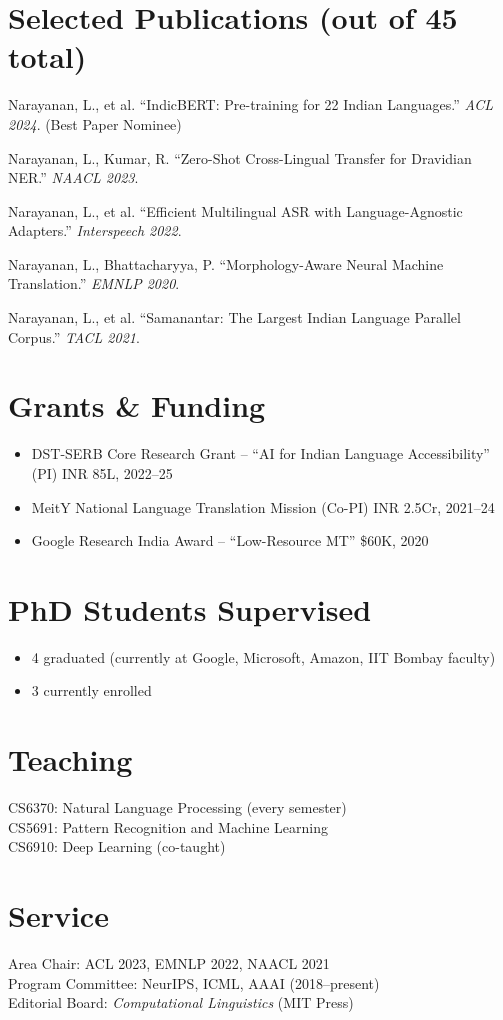 \documentclass[11pt,letterpaper]{article}
\begin{document}
\section{Selected Publications (out of 45 total)}
\begin{etaremune}[itemsep=3pt]
\item Narayanan, L., et al. ``IndicBERT: Pre-training for 22 Indian Languages.'' \textit{ACL 2024}. (Best Paper Nominee)
\item Narayanan, L., Kumar, R. ``Zero-Shot Cross-Lingual Transfer for Dravidian NER.'' \textit{NAACL 2023}.
\item Narayanan, L., et al. ``Efficient Multilingual ASR with Language-Agnostic Adapters.'' \textit{Interspeech 2022}.
\item Narayanan, L., Bhattacharyya, P. ``Morphology-Aware Neural Machine Translation.'' \textit{EMNLP 2020}.
\item Narayanan, L., et al. ``Samanantar: The Largest Indian Language Parallel Corpus.'' \textit{TACL 2021}.
\end{etaremune}

\section{Grants \& Funding}
\begin{itemize}
\item DST-SERB Core Research Grant -- ``AI for Indian Language Accessibility'' (PI) \hfill INR 85L, 2022--25
\item MeitY National Language Translation Mission (Co-PI) \hfill INR 2.5Cr, 2021--24
\item Google Research India Award -- ``Low-Resource MT'' \hfill \$60K, 2020
\end{itemize}

\section{PhD Students Supervised}
\begin{itemize}
\item 4 graduated (currently at Google, Microsoft, Amazon, IIT Bombay faculty)
\item 3 currently enrolled
\end{itemize}

\section{Teaching}
CS6370: Natural Language Processing (every semester)\\
CS5691: Pattern Recognition and Machine Learning\\
CS6910: Deep Learning (co-taught)

\section{Service}
Area Chair: ACL 2023, EMNLP 2022, NAACL 2021\\
Program Committee: NeurIPS, ICML, AAAI (2018--present)\\
Editorial Board: \textit{Computational Linguistics} (MIT Press)
\end{document}
